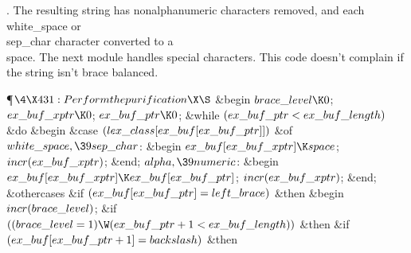 .
The resulting string has nonalphanumeric characters removed, and each
\\{white\_space} or \\{sep\_char} character converted to a \\{space}.  The next
module handles special characters.  This code doesn't complain if the
string isn't brace balanced.

\Y\P$\4\X431:Perform the purification\X\S$\6
\&{begin} $\\{brace\_level}\K0$;\6
$\\{ex\_buf\_xptr}\K0$;\6
$\\{ex\_buf\_ptr}\K0$;\6
\&{while} $(\\{ex\_buf\_ptr}<\\{ex\_buf\_length})$ \1\&{do}\6
\&{begin} \&{case} $(\\{lex\_class}[\\{ex\_buf}[\\{ex\_buf\_ptr}]])$ \1%
\&{of}\6
\4$\\{white\_space},\39\\{sep\_char}$: \&{begin} $\\{ex\_buf}[\\{ex\_buf%
\_xptr}]\K\\{space}$;\5
$\\{incr}(\\{ex\_buf\_xptr})$;\6
\&{end};\6
\4$\\{alpha},\39\\{numeric}$: \&{begin} $\\{ex\_buf}[\\{ex\_buf\_xptr}]\K%
\\{ex\_buf}[\\{ex\_buf\_ptr}]$;\5
$\\{incr}(\\{ex\_buf\_xptr})$;\6
\&{end};\6
\4\&{othercases} \&{if} $(\\{ex\_buf}[\\{ex\_buf\_ptr}]=\\{left\_brace})$ \1%
\&{then}\6
\&{begin} $\\{incr}(\\{brace\_level})$;\6
\&{if} $((\\{brace\_level}=1)\W(\\{ex\_buf\_ptr}+1<\\{ex\_buf\_length}))$ \1%
\&{then}\6
\&{if} $(\\{ex\_buf}[\\{ex\_buf\_ptr}+1]=\\{backslash})$ \1\&{then}\5
